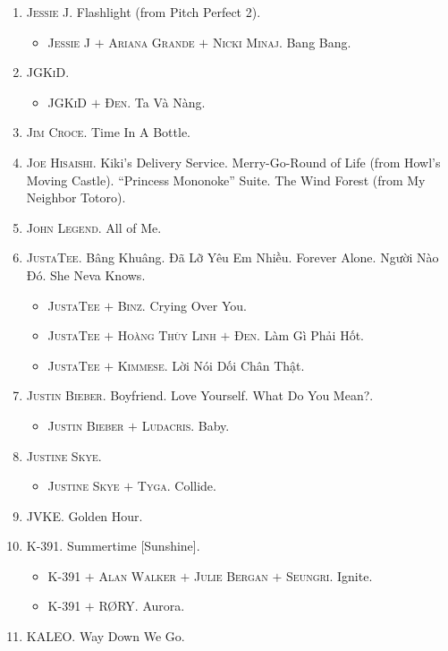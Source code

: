 \documentclass{article}
\begin{document}
\begin{enumerate}
	\item \textsc{Jessie J.} Flashlight (from Pitch Perfect 2).
	\begin{itemize}
		\item \textsc{Jessie J $+$ Ariana Grande $+$ Nicki Minaj.} Bang Bang.
	\end{itemize}
	\item \textsc{JGKiD.}
	\begin{itemize}
		\item \textsc{JGKiD $+$ Đen.} Ta Và Nàng.
	\end{itemize}
	\item \textsc{Jim Croce.} Time In A Bottle.
	\item \textsc{Joe Hisaishi.} Kiki's Delivery Service. Merry-Go-Round of Life (from Howl's Moving Castle). ``Princess Mononoke'' Suite. The Wind Forest (from My Neighbor Totoro).
	\item \textsc{John Legend.} All of Me.
	\item \textsc{JustaTee.} Bâng Khuâng. Đã Lỡ Yêu Em Nhiều. Forever Alone. Người Nào Đó. She Neva Knows.
	\begin{itemize}
		\item \textsc{JustaTee $+$ Binz.} Crying Over You.
		\item \textsc{JustaTee $+$ Hoàng Thùy Linh $+$ Đen.} Làm Gì Phải Hốt.
		\item \textsc{JustaTee $+$ Kimmese.} Lời Nói Dối Chân Thật.
	\end{itemize}
	\item \textsc{Justin Bieber.} Boyfriend. Love Yourself. What Do You Mean?.
	\begin{itemize}
		\item \textsc{Justin Bieber $+$ Ludacris.} Baby.
	\end{itemize}
	\item \textsc{Justine Skye.}
	\begin{itemize}
		\item \textsc{Justine Skye $+$ Tyga.} Collide.
	\end{itemize}
	\item\textsc{JVKE.} Golden Hour.
	\item \textsc{K-391.} Summertime [Sunshine].
	\begin{itemize}
		\item \textsc{K-391 $+$ Alan Walker $+$ Julie Bergan $+$ Seungri.} Ignite.
		\item \textsc{K-391 $+$ R{\O}RY.} Aurora.
	\end{itemize}
	\item \textsc{KALEO.} Way Down We Go.

\end{enumerate}
\end{document}
